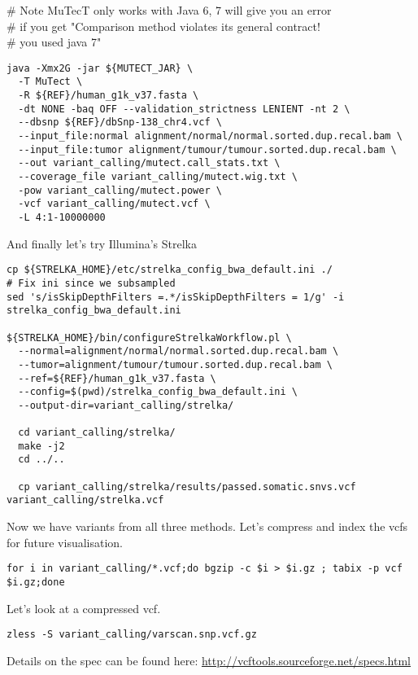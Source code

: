 # Note MuTecT only works with Java 6, 7 will give you an error \\
# if you get "Comparison method violates its general contract! \\
# you used java 7"

\begin{lstlisting}
java -Xmx2G -jar ${MUTECT_JAR} \
  -T MuTect \
  -R ${REF}/human_g1k_v37.fasta \
  -dt NONE -baq OFF --validation_strictness LENIENT -nt 2 \
  --dbsnp ${REF}/dbSnp-138_chr4.vcf \
  --input_file:normal alignment/normal/normal.sorted.dup.recal.bam \
  --input_file:tumor alignment/tumour/tumour.sorted.dup.recal.bam \
  --out variant_calling/mutect.call_stats.txt \
  --coverage_file variant_calling/mutect.wig.txt \
  -pow variant_calling/mutect.power \
  -vcf variant_calling/mutect.vcf \
  -L 4:1-10000000
\end{lstlisting}

And finally let's try Illumina's Strelka

\begin{lstlisting}
cp ${STRELKA_HOME}/etc/strelka_config_bwa_default.ini ./
# Fix ini since we subsampled
sed 's/isSkipDepthFilters =.*/isSkipDepthFilters = 1/g' -i strelka_config_bwa_default.ini

${STRELKA_HOME}/bin/configureStrelkaWorkflow.pl \
  --normal=alignment/normal/normal.sorted.dup.recal.bam \
  --tumor=alignment/tumour/tumour.sorted.dup.recal.bam \
  --ref=${REF}/human_g1k_v37.fasta \
  --config=$(pwd)/strelka_config_bwa_default.ini \
  --output-dir=variant_calling/strelka/

  cd variant_calling/strelka/
  make -j2
  cd ../..

  cp variant_calling/strelka/results/passed.somatic.snvs.vcf variant_calling/strelka.vcf
\end{lstlisting}

Now we have variants from all three methods. Let's compress and index the vcfs for future visualisation.

\begin{lstlisting}
for i in variant_calling/*.vcf;do bgzip -c $i > $i.gz ; tabix -p vcf $i.gz;done
\end{lstlisting}

Let's look at a compressed vcf.

\begin{lstlisting}
zless -S variant_calling/varscan.snp.vcf.gz
\end{lstlisting}

Details on the spec can be found here:
\url{http://vcftools.sourceforge.net/specs.html}


